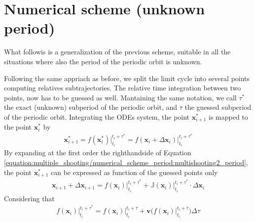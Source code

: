 \documentclass[letterpaper,10pt,english,openany,oneside]{sphinxmanual}
\begin{document}
\section{Numerical scheme (unknown period)}
\label{\detokenize{multiple_shooting/numerical_scheme_period:numerical-scheme-unknown-period}}\label{\detokenize{multiple_shooting/numerical_scheme_period::doc}}
What followis is a generalization of the previous scheme, suitable in all the situations where also the period of the periodic orbit is unknown.

\begin{figure}[htbp]
\centering

\noindent{}
\end{figure}

Following the same appriach as before, we split the limit cycle into several points computing relatives sub\sphinxhyphen{}trajectories.
The relative time integration between two points, now has to be guessed as well. Mantaining the same notation, we call \(\tau^{*}\) the exact (unknown) subperiod of the periodic orbit, and \(\overline{\tau}\) the guessed subperiod of the periodic orbit.
Integrating the ODEs system, the point \(\mathbf{x}^*_{i+1}\) is mapped to the point  \(\mathbf{x}^*_{i}\) by
\begin{equation}\label{equation:multiple_shooting/numerical_scheme_period:multishooting2_period}
\begin{split}\mathbf{x}^*_{i+1} = f(\mathbf{x}^*_i)  \big \rvert_{t_{i}}^{t_{i}+\tau^{*}} = f(\mathbf{x}_i + \Delta\mathbf{x}_i) \big \rvert_{t_{i}}^{t_{i}+\tau^{*}}\end{split}
\end{equation}
By expanding at the first order the right\sphinxhyphen{}hand\sphinxhyphen{}side of Equation \eqref{equation:multiple_shooting/numerical_scheme_period:multishooting2_period}, the point \(\mathbf{x}^*_{i+1}\) can be expressed as function of the guessed points only
\begin{equation}\label{equation:multiple_shooting/numerical_scheme_period:multishooting3_period}
\begin{split}\mathbf{x}_{i+1} + \Delta\mathbf{x}_{i+1}  =f(\mathbf{x}_i) \big \rvert_{t_{i}}^{t_{i}+\tau^{*}} + \mathbb{J} (\mathbf{x}_i) \Big \rvert_{t_{i}}^{t_{i}+\tau^{*}}\cdot\Delta\mathbf{x}_i\end{split}
\end{equation}
Considering that
\begin{equation}\label{equation:multiple_shooting/numerical_scheme_period:period_iteration}
\begin{split}f(\mathbf{x}_i)  \big \rvert_{t_{i}}^{t_{i}+\tau^{*}} = f(\mathbf{x}_i)  \big \rvert_{t_{i}}^{t_{i}+\overline{\tau}} + \mathbf{v} \big ( f(\mathbf{x}_i)  \big \rvert_{t_{i}}^{t_{i}+\overline{\tau}}\big ) \Delta \tau\end{split}
\end{equation}
\end{document}
